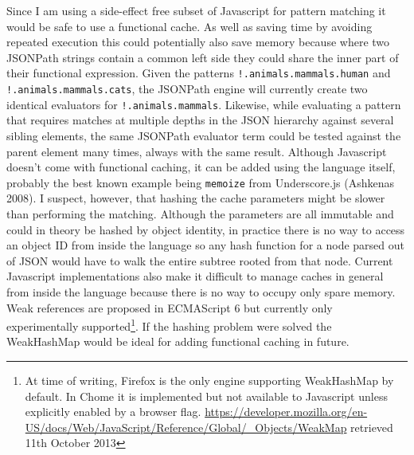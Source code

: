 \documentclass[12pt, ]{article}
\begin{document}
Since I am using a side-effect free subset of Javascript for pattern
matching it would be safe to use a functional cache. As well as saving
time by avoiding repeated execution this could potentially also save
memory because where two JSONPath strings contain a common left side
they could share the inner part of their functional expression. Given
the patterns \texttt{!.animals.mammals.human} and
\texttt{!.animals.mammals.cats}, the JSONPath engine will currently
create two identical evaluators for \texttt{!.animals.mammals}.
Likewise, while evaluating a pattern that requires matches at multiple
depths in the JSON hierarchy against several sibling elements, the same
JSONPath evaluator term could be tested against the parent element many
times, always with the same result. Although Javascript doesn't come
with functional caching, it can be added using the language itself,
probably the best known example being \texttt{memoize} from
Underscore.js (Ashkenas 2008). I suspect, however, that hashing the
cache parameters might be slower than performing the matching. Although
the parameters are all immutable and could in theory be hashed by object
identity, in practice there is no way to access an object ID from inside
the language so any hash function for a node parsed out of JSON would
have to walk the entire subtree rooted from that node. Current
Javascript implementations also make it difficult to manage caches in
general from inside the language because there is no way to occupy only
spare memory. Weak references are proposed in ECMAScript 6 but currently
only experimentally supported\footnote{At time of writing, Firefox is
  the only engine supporting WeakHashMap by default. In Chome it is
  implemented but not available to Javascript unless explicitly enabled
  by a browser flag.
  \url{https://developer.mozilla.org/en-US/docs/Web/JavaScript/Reference/Global/_Objects/WeakMap}
  retrieved 11th October 2013}. If the hashing problem were solved the
WeakHashMap would be ideal for adding functional caching in future.
\end{document}
